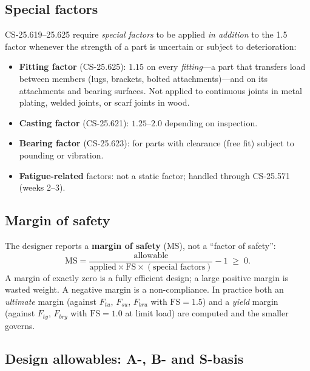 \documentclass[11pt,a4paper]{article}
\begin{document}
\subsection{Special factors}

CS-25.619--25.625 require \emph{special factors} to be applied \emph{in addition} to the 1.5 factor whenever the strength of a part is uncertain or subject to deterioration:
\begin{itemize}[nosep]
  \item \textbf{Fitting factor} (CS-25.625): $1.15$ on every \emph{fitting}---a part that transfers load between members (lugs, brackets, bolted attachments)---and on its attachments and bearing surfaces. Not applied to continuous joints in metal plating, welded joints, or scarf joints in wood.
  \item \textbf{Casting factor} (CS-25.621): $1.25$--$2.0$ depending on inspection.
  \item \textbf{Bearing factor} (CS-25.623): for parts with clearance (free fit) subject to pounding or vibration.
  \item \textbf{Fatigue-related} factors: not a static factor; handled through CS-25.571 (weeks 2--3).
\end{itemize}

\subsection{Margin of safety}

The designer reports a \textbf{margin of safety} (MS), not a ``factor of safety'':
\begin{equation}
  \mathrm{MS} = \frac{\text{allowable}}{\text{applied} \times \mathrm{FS}\times(\text{special factors})} - 1 \;\ge\; 0.
  \label{eq:ms}
\end{equation}
A margin of exactly zero is a fully efficient design; a large positive margin is wasted weight. A negative margin is a non-compliance. In practice both an \emph{ultimate} margin (against $F_{tu}$, $F_{su}$, $F_{bru}$ with $\mathrm{FS}=1.5$) and a \emph{yield} margin (against $F_{ty}$, $F_{bry}$ with $\mathrm{FS}=1.0$ at limit load) are computed and the smaller governs.

\subsection{Design allowables: A-, B- and S-basis}
\end{document}
